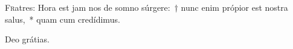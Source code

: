 \lettrine{F}{r}atres: Hora est jam nos de somno súrgere:~† nunc enim própior est nostra salus,~* quam cum credídimus.

\rr Deo grátias.